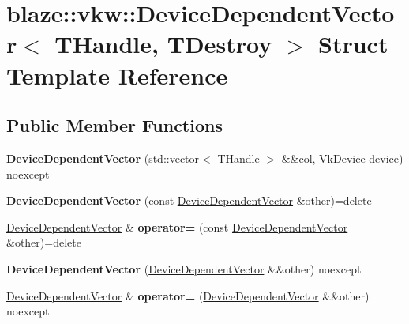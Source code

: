 \hypertarget{structblaze_1_1vkw_1_1DeviceDependentVector}{}\section{blaze\+:\+:vkw\+:\+:Device\+Dependent\+Vector$<$ T\+Handle, T\+Destroy $>$ Struct Template Reference}
\label{structblaze_1_1vkw_1_1DeviceDependentVector}
\subsection*{Public Member Functions}
\begin{DoxyCompactItemize}
\item 
\mbox{\label{structblaze_1_1vkw_1_1DeviceDependentVector_a72c1f29588f9054ad09ee913569c21c7}} 
{\bfseries Device\+Dependent\+Vector} (std\+::vector$<$ T\+Handle $>$ \&\&col, Vk\+Device device) noexcept
\item 
\mbox{\label{structblaze_1_1vkw_1_1DeviceDependentVector_a6f3e80fc9f910b925d1513d2683b6331}} 
{\bfseries Device\+Dependent\+Vector} (const \hyperlink{structblaze_1_1vkw_1_1DeviceDependentVector}{Device\+Dependent\+Vector} \&other)=delete
\item 
\mbox{\label{structblaze_1_1vkw_1_1DeviceDependentVector_a603658f54313e99994bce52faa4a80ef}} 
\hyperlink{structblaze_1_1vkw_1_1DeviceDependentVector}{Device\+Dependent\+Vector} \& {\bfseries operator=} (const \hyperlink{structblaze_1_1vkw_1_1DeviceDependentVector}{Device\+Dependent\+Vector} \&other)=delete
\item 
\mbox{\label{structblaze_1_1vkw_1_1DeviceDependentVector_a048885918db0007d8b67f4a5ad10c153}} 
{\bfseries Device\+Dependent\+Vector} (\hyperlink{structblaze_1_1vkw_1_1DeviceDependentVector}{Device\+Dependent\+Vector} \&\&other) noexcept
\item 
\mbox{\label{structblaze_1_1vkw_1_1DeviceDependentVector_abb9324e15a25ad380de9ec73d2ec32d6}} 
\hyperlink{structblaze_1_1vkw_1_1DeviceDependentVector}{Device\+Dependent\+Vector} \& {\bfseries operator=} (\hyperlink{structblaze_1_1vkw_1_1DeviceDependentVector}{Device\+Dependent\+Vector} \&\&other) noexcept

\end{DoxyCompactItemize}
